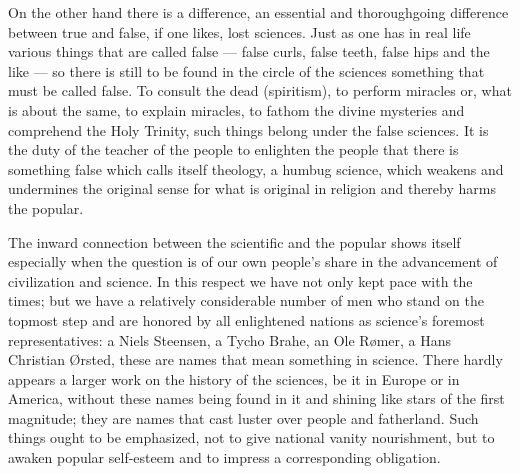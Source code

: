 \documentclass[12pt,a4paper,openany]{book}
\newcommand{\opage}[1]{\marginnote{\footnotesize\textit{[#1]}}}
\begin{document}
On the other hand there is a difference, an essential and
thoroughgoing difference between true and false, if one
likes, lost sciences. Just as one has in real
life various things that are called false
--- false curls, false teeth, false hips
and the like --- so there is still to be found in the
circle of the sciences something that must be called false. To
consult the dead (spiritism), to perform miracles
or, what is about the same, to explain
miracles, to fathom the divine mysteries and comprehend
the Holy Trinity, such things belong under the
false sciences. It is the duty of the teacher of the people to
enlighten the people that there is something false which
calls itself theology, a humbug science, which weakens
and undermines the original sense for what is original in religion
and thereby harms the popular.

The inward connection between the scientific
and the popular shows itself especially when
the question is of our own people's share in the advancement of civilization
and science. In this respect we have
not only kept pace with the times; but we have a relatively considerable number of men
who stand on the topmost step and are honored by all enlightened
\setcounter{footnote}{0}%
\opage{130}nations as science's foremost representatives:
a Niels Steensen, a Tycho Brahe, an Ole
Rømer, a Hans Christian Ørsted, these are names that
mean something in science. There hardly appears a larger work on the history of the sciences, be
it in Europe or in America, without these names
being found in it and shining like stars of the first magnitude;
they are names that cast luster over people and fatherland.
Such things ought to be emphasized, not to give national
vanity nourishment, but to awaken
popular self-esteem and to impress a corresponding
obligation.
\end{document}

